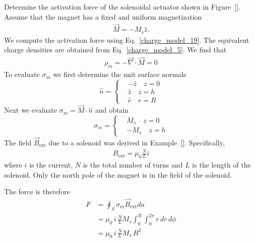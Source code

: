 \documentclass[12pt,a4paper,oneside]{book}
\begin{document}
\begin{onehalfspace}
\begin{example}
	Determine the activation force of the solenoidal actuator shown in Figure~\ref{}. Assume that the magnet has a fixed and uniform magnetization 
	\begin{equation*}\label{}
		{\begin{aligned}
				\vec{M} =-M_s\hat{z}.
		\end{aligned}}
	\end{equation*}
	We compute the activation force using Eq.~\eqref{charge_model_19}. The equivalent charge densities are obtained from Eq.~\eqref{charge_model_5}. We find that 
	\begin{equation*}\label{}
	{\begin{aligned}
			\rho_m =-\vec{\nabla}\cdot\vec{M}=0
	\end{aligned}}
	\end{equation*}
	To evaluate $\sigma_m$ we first determine the unit surface normals
	\begin{equation*}\label{}
		\hat{n} = \left\lbrace 
		\begin{aligned}
			&-\hat{z}\quad z=0 \\[6pt]	
			&\hat{z}\quad z=h \\[6pt]
			&\hat{r}\quad r=R 
		\end{aligned}\right. 
	\end{equation*} 
	Next we evaluate $\sigma_m=\vec{M}\cdot\hat{n}$ and obtain
	\begin{equation*}\label{}
	\sigma_m = \left\lbrace 
	\begin{aligned}
		&M_s\quad z=0 \\[6pt]	
		&-M_s\quad z=h 
	\end{aligned}\right. 
	\end{equation*} 	 
The field $\vec{B}_{\text{ext}}$ due to a solenoid was derived in Example~\ref{}. Specifically,
	\begin{equation*}\label{}
	\begin{aligned}
		B_{\text{ext}}=\mu_0\frac{N}{L}i
	\end{aligned}
	\end{equation*} 
where $i$ is the current, $N$ is the total number of turns and $L$ is the length of the solenoid. Only the north pole of the magnet is in the field of the solenoid.

The force is therefore
	\begin{equation*}\label{}
	\begin{aligned}
		F &= \oint_{S}\sigma_m\vec{B}_{\text{ext}}da \\[6pt]
		&= \mu_0\,i\,\frac{N}{L}M_s\int_{0}^{R}\int_{0}^{2\pi}r\,dr\,d\phi \\[6pt]
		&= \mu_0\,i\,\frac{N}{L}M_s\,R^2
	\end{aligned}
	\end{equation*} 
\end{example}

\end{onehalfspace}
\end{document}
